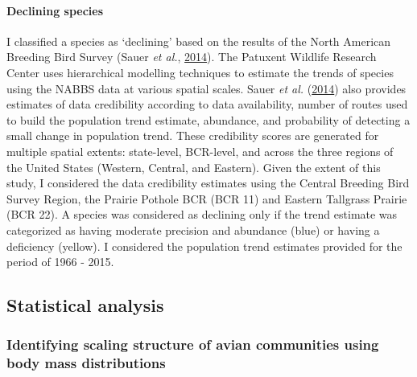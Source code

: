 \documentclass[print]{nuthesis}
\begin{document}
\hypertarget{declining-species}{%
\paragraph{Declining species}\label{declining-species}}

I classified a species as `declining' based on the results of the North American Breeding Bird Survey (Sauer \emph{et al.}, \protect\hyperlink{ref-sauer2017results}{2014}). The Patuxent Wildlife Research Center uses hierarchical modelling techniques to estimate the trends of species using the NABBS data at various spatial scales. Sauer \emph{et al.} (\protect\hyperlink{ref-sauer2017results}{2014}) also provides estimates of data credibility according to data availability, number of routes used to build the population trend estimate, abundance, and probability of detecting a small change in population trend. These credibility scores are generated for multiple spatial extents: state-level, BCR-level, and across the three regions of the United States (Western, Central, and Eastern). Given the extent of this study, I considered the data credibility estimates using the Central Breeding Bird Survey Region, the Prairie Pothole BCR (BCR 11) and Eastern Tallgrass Prairie (BCR 22). A species was considered as declining only if the trend estimate was categorized as having moderate precision and abundance (blue) or having a deficiency (yellow). I considered the population trend estimates provided for the period of 1966 - 2015.

\hypertarget{statistical-analysis}{%
\subsection{Statistical analysis}\label{statistical-analysis}}

\hypertarget{identifying-scaling-structure-of-avian-communities-using-body-mass-distributions}{%
\subsubsection{Identifying scaling structure of avian communities using body mass distributions}\label{identifying-scaling-structure-of-avian-communities-using-body-mass-distributions}}
\end{document}
